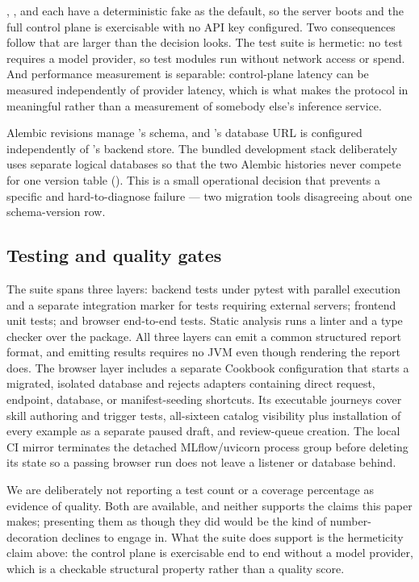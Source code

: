  ,
, and  each have a deterministic fake as the
default, so the server boots and the full control plane is exercisable with no API
key configured. Two consequences follow that are larger than the decision looks.
The test suite is hermetic: no test requires a model provider, so
\statTestFiles{} test modules run without network access or spend. And performance
measurement is separable: control-plane latency can be measured independently of
provider latency, which is what makes the protocol in 
meaningful rather than a measurement of somebody else's inference service.

 \statMigrations{} Alembic revisions
manage \sys's schema, and \sys's database URL is configured independently of
\mlflow{}'s backend store. The bundled development stack deliberately uses separate
logical databases so that the two Alembic histories never compete for one version
table (). This is a small operational decision that prevents
a specific and hard-to-diagnose failure --- two migration tools disagreeing about
one schema-version row.

\subsection{Testing and quality gates}

The suite spans three layers: backend tests under pytest with parallel execution
and a separate integration marker for tests requiring external servers; frontend
unit tests; and browser end-to-end tests. Static analysis runs a linter and a type
checker over the package. All three layers can emit a common structured report
format, and emitting results requires no JVM even though rendering the report does.
The browser layer includes a separate Cookbook configuration that starts a migrated,
isolated database and rejects adapters containing direct request, endpoint, database,
or manifest-seeding shortcuts.  Its executable journeys cover skill authoring and
trigger tests, all-sixteen catalog visibility plus installation of every example as
a separate paused draft, and review-queue creation.  The local CI mirror terminates the detached
MLflow/uvicorn process group before deleting its state so a passing browser run does
not leave a listener or database behind.

We are deliberately not reporting a test count or a coverage percentage as evidence
of quality. Both are available, and neither supports the claims this paper makes;
presenting them as though they did would be the kind of number-decoration
 declines to engage in. What the suite does support is the
hermeticity claim above: the control plane is exercisable end to end without a model
provider, which is a checkable structural property rather than a quality score.


